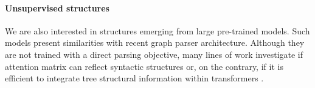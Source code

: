




\paragraph{Unsupervised structures} We are also interested in structures emerging from large pre-trained models. Such models present similarities with recent graph parser architecture. Although they are not trained with a direct parsing objective, many lines of work investigate if attention matrix can reflect syntactic structures \parencite{jawahar_19, clark_19, ravishankar_21} or, on the contrary, if it is efficient to integrate tree structural information within transformers \parencite{wang_19, bai_21}. 

